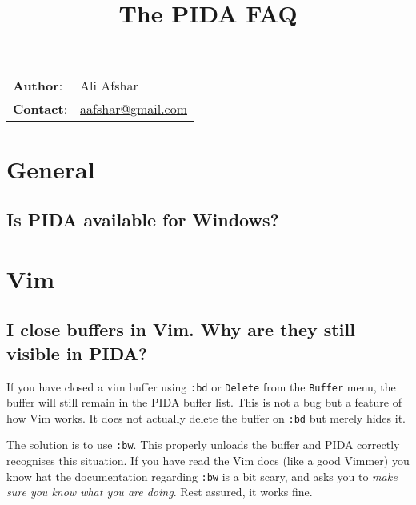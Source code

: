 \documentclass[10pt,a4paper,english]{article}
\title{The PIDA FAQ}
\author{}
\date{}
\newlength{\docinfowidth}
\newlength{\locallinewidth}
\begin{document}
\maketitle

\begin{center}
\begin{tabularx}{\docinfowidth}{lX}
\textbf{Author}: &
	Ali Afshar \\
\textbf{Contact}: &
	\href{mailto:aafshar@gmail.com}{aafshar@gmail.com} \\
\end{tabularx}
\end{center}

\setlength{\locallinewidth}{\linewidth}



\hypertarget{general}{}
\section*{General}



\hypertarget{is-pida-available-for-windows}{}
\subsection*{Is PIDA available for Windows?}



\hypertarget{vim}{}
\section*{Vim}



\hypertarget{i-close-buffers-in-vim-why-are-they-still-visible-in-pida}{}
\subsection*{I close buffers in Vim. Why are they still visible in PIDA?}

If you have closed a vim buffer using \texttt{:bd} or \texttt{Delete} from the
\texttt{Buffer} menu, the buffer will still remain in the PIDA buffer list. This is
not a bug but a feature of how Vim works. It does not actually delete the
buffer on \texttt{:bd} but merely hides it.

The solution is to use \texttt{:bw}. This properly unloads the buffer and PIDA
correctly recognises this situation. If you have read the Vim docs (like a
good Vimmer) you know hat the documentation regarding \texttt{:bw} is a bit scary,
and asks you to \emph{make sure you know what you are doing}. Rest assured, it
works fine.
\end{document}
